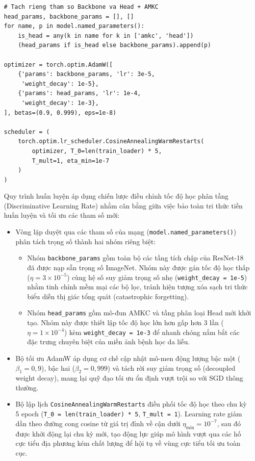 \begin{lstlisting}[caption={Cấu hình AdamW và Cosine Annealing Scheduler}]
# Tach rieng tham so Backbone va Head + AMKC
head_params, backbone_params = [], []
for name, p in model.named_parameters():
    is_head = any(k in name for k in ['amkc', 'head'])
    (head_params if is_head else backbone_params).append(p)

optimizer = torch.optim.AdamW([
    {'params': backbone_params, 'lr': 3e-5,
     'weight_decay': 1e-5},
    {'params': head_params, 'lr': 1e-4,
     'weight_decay': 1e-3},
], betas=(0.9, 0.999), eps=1e-8)

scheduler = (
    torch.optim.lr_scheduler.CosineAnnealingWarmRestarts(
        optimizer, T_0=len(train_loader) * 5,
        T_mult=1, eta_min=1e-7
    )
)
\end{lstlisting}
Quy trình huấn luyện áp dụng chiến lược điều chỉnh tốc độ học phân tầng (Discriminative Learning Rate) nhằm cân bằng giữa việc bảo toàn tri thức tiền huấn luyện và tối ưu các tham số mới:
\begin{itemize}
  \item Vòng lặp duyệt qua các tham số của mạng (\texttt{model.named\_parameters()}) phân tách trọng số thành hai nhóm riêng biệt:
  \begin{itemize}
    \item Nhóm \texttt{backbone\_params} gồm toàn bộ các tầng tích chập của ResNet-18 đã được nạp sẵn trọng số ImageNet. Nhóm này được gán tốc độ học thấp ($\eta = 3\times 10^{-5}$) cùng hệ số suy giảm trọng số nhẹ (\texttt{weight\_decay = 1e-5}) nhằm tinh chỉnh mềm mại các bộ lọc, tránh hiện tượng xóa sạch tri thức biểu diễn thị giác tổng quát (catastrophic forgetting).
    \item Nhóm \texttt{head\_params} gồm mô-đun AMKC và tầng phân loại Head mới khởi tạo. Nhóm này được thiết lập tốc độ học lớn hơn gấp hơn 3 lần ($\eta = 1\times 10^{-4}$) kèm \texttt{weight\_decay = 1e-3} để nhanh chóng nắm bắt các đặc trưng chuyên biệt của miền ảnh bệnh học da liễu.
  \end{itemize}
  \item Bộ tối ưu AdamW áp dụng cơ chế cập nhật mô-men động lượng bậc một ($\beta_1 = 0{,}9$), bậc hai ($\beta_2 = 0{,}999$) và tách rời suy giảm trọng số (decoupled weight decay), mang lại quỹ đạo tối ưu ổn định vượt trội so với SGD thông thường.
  \item Bộ lập lịch \texttt{CosineAnnealingWarmRestarts} điều phối tốc độ học theo chu kỳ 5 epoch (\texttt{T\_0 = len(train\_loader) * 5}, \texttt{T\_mult = 1}). Learning rate giảm dần theo đường cong cosine từ giá trị đỉnh về cận dưới $\eta_{\mathrm{min}} = 10^{-7}$, sau đó được khởi động lại chu kỳ mới, tạo động lực giúp mô hình vượt qua các hố cực tiểu địa phương kém chất lượng để hội tụ về vùng cực tiểu tối ưu toàn cục.
\end{itemize}



